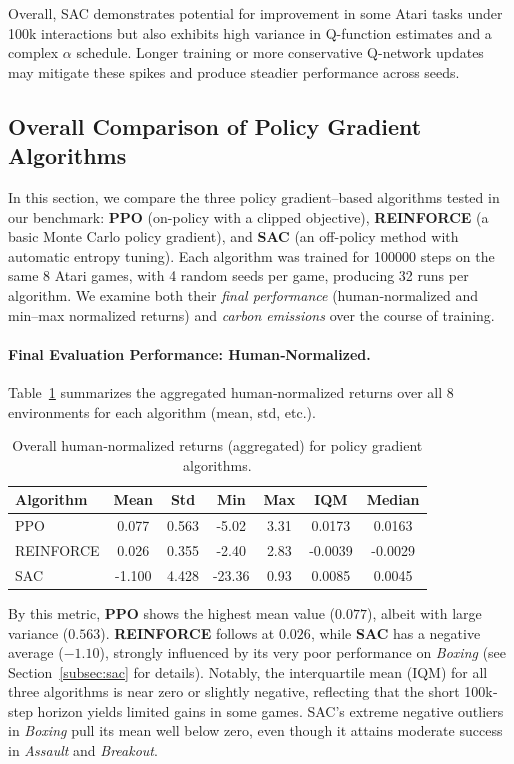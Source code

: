 Overall, SAC demonstrates potential for improvement in some Atari tasks under 100k interactions but also exhibits high variance in Q-function estimates and a complex \(\alpha\) schedule. Longer training or more conservative Q-network updates may mitigate these spikes and produce steadier performance across seeds. 


\subsection{Overall Comparison of Policy Gradient Algorithms}
\label{subsec:policy_comparison}

In this section, we compare the three policy gradient–based algorithms tested in our benchmark: \textbf{PPO} (on-policy with a clipped objective), \textbf{REINFORCE} (a basic Monte Carlo policy gradient), and \textbf{SAC} (an off-policy method with automatic entropy tuning). Each algorithm was trained for \num{100000} steps on the same 8 Atari games, with 4 random seeds per game, producing 32 runs per algorithm. We examine both their \emph{final performance} (human‐normalized and min–max normalized returns) and \emph{carbon emissions} over the course of training.

\paragraph{Final Evaluation Performance: Human‐Normalized.}
Table~\ref{tab:policy_final_eval_human} summarizes the aggregated human‐normalized returns over all 8 environments for each algorithm (mean, std, etc.). 
\begin{table}[htbp]
	\centering
	\caption{Overall human‐normalized returns (aggregated) for policy gradient algorithms.}
	\label{tab:policy_final_eval_human}
	\begin{tabular}{lcccccc}
		\toprule
		\textbf{Algorithm} & \textbf{Mean} & \textbf{Std} & \textbf{Min} & \textbf{Max} & \textbf{IQM} & \textbf{Median} \\
		\midrule
		PPO         & 0.077 & 0.563 & -5.02 & 3.31 & 0.0173 & 0.0163 \\
		REINFORCE   & 0.026 & 0.355 & -2.40 & 2.83 & -0.0039 & -0.0029 \\
		SAC         & -1.100 & 4.428 & -23.36 & 0.93 & 0.0085 & 0.0045 \\
		\bottomrule
	\end{tabular}
\end{table}

\noindent
By this metric, \textbf{PPO} shows the highest mean value ($0.077$), albeit with large variance ($0.563$). \textbf{REINFORCE} follows at $0.026$, while \textbf{SAC} has a negative average ($-1.10$), strongly influenced by its very poor performance on \emph{Boxing} (see Section~\ref{subsec:sac} for details). Notably, the interquartile mean (IQM) for all three algorithms is near zero or slightly negative, reflecting that the short 100k‐step horizon yields limited gains in some games. SAC’s extreme negative outliers in \emph{Boxing} pull its mean well below zero, even though it attains moderate success in \emph{Assault} and \emph{Breakout}.

